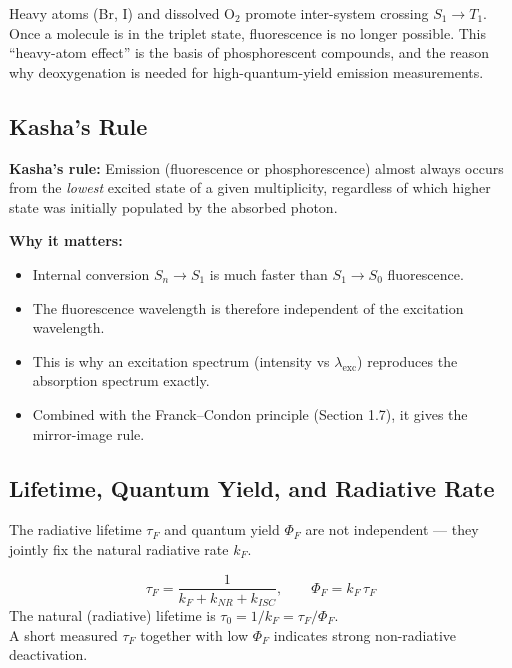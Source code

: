 \documentclass[12pt,a4paper]{article}
\begin{document}
\begin{tcolorbox}[masonbox, title={Why Heavy Atoms and Oxygen Quench Fluorescence}]
Heavy atoms (Br, I) and dissolved $\mathrm{O_2}$ promote inter-system crossing $S_1\to T_1$. Once a molecule is in the triplet state, fluorescence is no longer possible. This ``heavy-atom effect'' is the basis of phosphorescent compounds, and the reason why deoxygenation is needed for high-quantum-yield emission measurements.
\end{tcolorbox}

\subsection{Kasha's Rule}
\begin{tcolorbox}[defbox]
\textbf{Kasha's rule:} Emission (fluorescence or phosphorescence) almost always occurs from the \emph{lowest} excited state of a given multiplicity, regardless of which higher state was initially populated by the absorbed photon.
\end{tcolorbox}

\textbf{Why it matters:}
\begin{itemize}[leftmargin=*, itemsep=2pt, topsep=2pt]
  \item Internal conversion $S_n \to S_1$ is much faster than $S_1 \to S_0$ fluorescence.
  \item The fluorescence wavelength is therefore independent of the excitation wavelength.
  \item This is why an excitation spectrum (intensity vs $\lambda_{\mathrm{exc}}$) reproduces the absorption spectrum exactly.
  \item Combined with the Franck--Condon principle (Section 1.7), it gives the mirror-image rule.
\end{itemize}

\subsection{Lifetime, Quantum Yield, and Radiative Rate}
The radiative lifetime $\tau_F$ and quantum yield $\Phi_F$ are not independent — they jointly fix the natural radiative rate $k_F$.

\begin{tcolorbox}[formulabox, title={Lifetime--Quantum Yield Connection}]
\[
\tau_F=\frac{1}{k_F+k_{NR}+k_{ISC}}, \qquad \Phi_F=k_F\,\tau_F
\]
The natural (radiative) lifetime is $\tau_0=1/k_F=\tau_F/\Phi_F$.\\
A short measured $\tau_F$ together with low $\Phi_F$ indicates strong non-radiative deactivation.
\end{tcolorbox}
\end{document}
